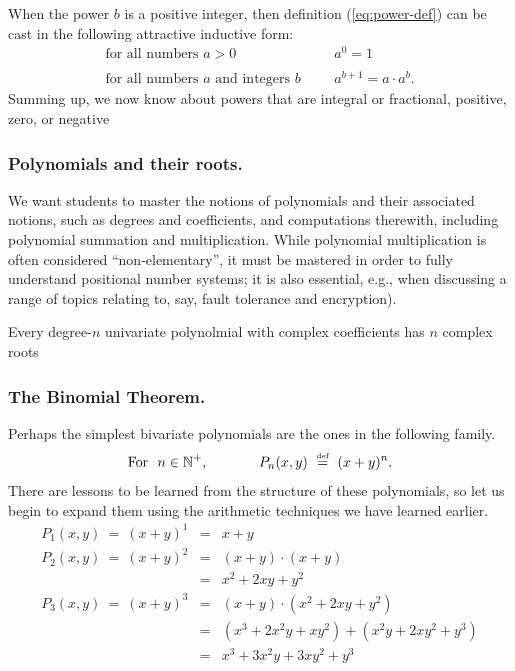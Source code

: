 When the power $b$ is a positive integer, then definition
(\ref{eq:power-def}) can be cast in the following attractive inductive
form:
\begin{equation}
\label{eq:power-def-integer}
\begin{array}{llll}
\mbox{for all numbers $a>0$} & & & a^0 = 1 \\
 & & & \\
\mbox{for all numbers $a$ and integers $b$} & & & a^{b+1} = a \cdot
a^b.
\end{array}
\end{equation}
Summing up, we now know about powers that are integral or fractional,
positive, zero, or negative

\subsubsection{Polynomials and their roots.}
\label{sec:poly-roots}
We want students to master the notions of polynomials and their
associated notions, such as degrees and coefficients, and computations
therewith, including polynomial summation and multiplication.  While
polynomial multiplication is often considered ``non-elementary'', it
must be mastered in order to fully understand positional number
systems; it is also essential, e.g., when discussing a range of topics
relating to, say, fault tolerance and encryption).

\begin{theorem}
Every degree-$n$ univariate polynolmial with complex coefficients has
$n$ complex roots 
\end{theorem}

\subsubsection{The Binomial Theorem.}
\label{sec:Binomial-thm}

Perhaps the simplest bivariate polynomials are the ones in the
following family.
\begin{equation}
\label{eq:binomial-polys}
\mbox{For } \ n \in \mathbb{N}^+, \hspace*{.5in}
P_n(x,y) \ \stackrel{\mbox{{\tiny def}}}{=} \ (x+y)^n.
\end{equation}
There are lessons to be learned from the structure of these
polynomials, so let us begin to expand them using the arithmetic
techniques we have learned earlier.
\begin{eqnarray*}
P_1(x,y) \ = \
(x+y)^1 & = & x+y  \\
P_2(x,y) \ = \
(x+y)^2 & = & (x+y) \cdot (x+y) \\
        & = & x^2 + 2xy + y^2 \\
P_3(x,y) \ = \
(x+y)^3 & = & (x+y) \cdot (x^2 + 2xy + y^2) \\
   & = & (x^3 + 2x^2y +  xy^2) + (x^2y + 2xy^2 + y^3) \\
   & = & x^3 + 3x^2y + 3xy^2 + y^3  
\end{eqnarray*}

